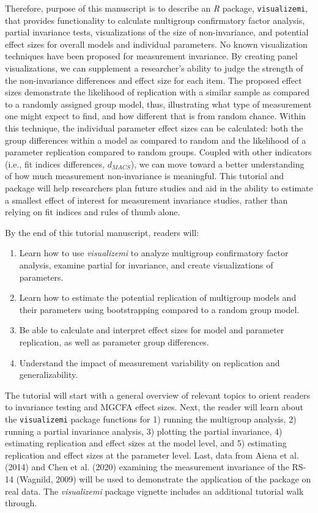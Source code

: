 \documentclass[
  man,floatsintext]{apa7}
\providecommand{\tightlist}{%
  \setlength{\itemsep}{0pt}\setlength{\parskip}{0pt}}
\begin{document}
Therefore, purpose of this manuscript is to describe an \emph{R} package, \texttt{visualizemi}, that provides functionality to calculate multigroup confirmatory factor analysis, partial invariance tests, visualizations of the size of non-invariance, and potential effect sizes for overall models and individual parameters. No known visualization techniques have been proposed for measurement invariance. By creating panel visualizations, we can supplement a researcher's ability to judge the strength of the non-invariance differences and effect size for each item. The proposed effect sizes demonstrate the likelihood of replication with a similar sample as compared to a randomly assigned group model, thus, illustrating what type of measurement one might expect to find, and how different that is from random chance. Within this technique, the individual parameter effect sizes can be calculated: both the group differences within a model as compared to random and the likelihood of a parameter replication compared to random groups. Coupled with other indicators (i.e., fit indices differences, \(d_{MACS}\)), we can move toward a better understanding of how much measurement non-invariance is meaningful. This tutorial and package will help researchers plan future studies and aid in the ability to estimate a smallest effect of interest for measurement invariance studies, rather than relying on fit indices and rules of thumb alone.

By the end of this tutorial manuscript, readers will:

\begin{enumerate}
\def\labelenumi{\arabic{enumi}.}
\tightlist
\item
  Learn how to use \emph{visualizemi} to analyze multigroup confirmatory factor analysis, examine partial for invariance, and create visualizations of parameters.
\item
  Learn how to estimate the potential replication of multigroup models and their parameters using bootstrapping compared to a random group model.
\item
  Be able to calculate and interpret effect sizes for model and parameter replication, as well as parameter group differences.
\item
  Understand the impact of measurement variability on replication and generalizability.
\end{enumerate}

The tutorial will start with a general overview of relevant topics to orient readers to invariance testing and MGCFA effect sizes. Next, the reader will learn about the \texttt{visualizemi} package functions for 1) running the multigroup analysis, 2) running a partial invariance analysis, 3) plotting the partial invariance, 4) estimating replication and effect sizes at the model level, and 5) estimating replication and effect sizes at the parameter level. Last, data from Aiena et al. (2014) and Chen et al. (2020) examining the measurement invariance of the RS-14 (Wagnild, 2009) will be used to demonstrate the application of the package on real data. The \emph{visualizemi} package vignette includes an additional tutorial walk through.
\end{document}
